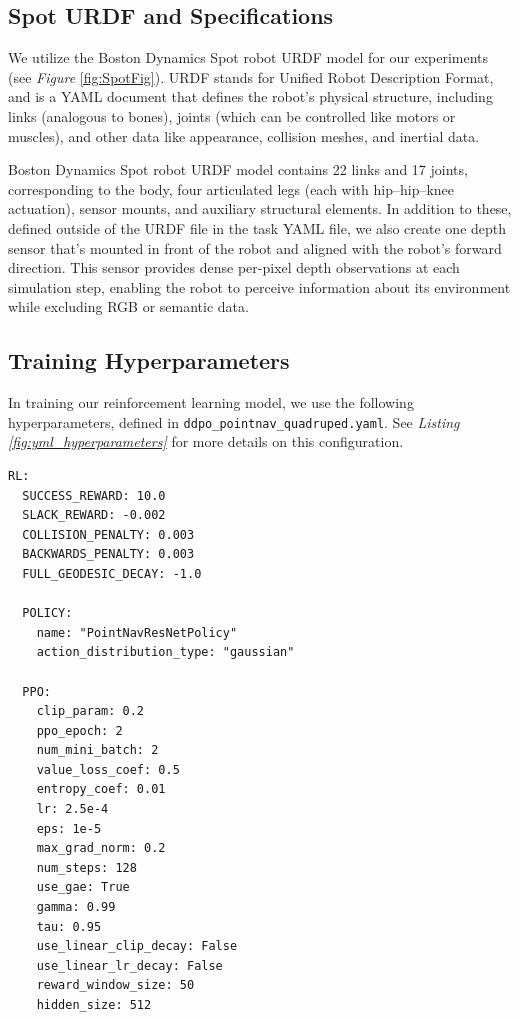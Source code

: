 \documentclass{article} %
\begin{document}
\subsection{Spot URDF and Specifications}
We utilize the Boston Dynamics Spot robot URDF model for our experiments (see \textit{Figure} \ref{fig:SpotFig}). URDF stands for Unified Robot Description Format, and is a YAML document that defines the robot's physical structure, including links (analogous to bones), joints (which can be controlled like motors or muscles), and other data like appearance, collision meshes, and inertial data.

Boston Dynamics Spot robot URDF model contains 22 links and 17 joints, corresponding to the body, four articulated legs (each with hip–hip–knee actuation), sensor mounts, and auxiliary structural elements. In addition to these, defined outside of the URDF file in the task YAML file, we also create one depth sensor that's mounted in front of the robot and aligned with the robot's forward direction. This sensor provides dense per-pixel depth observations at each simulation step, enabling the robot to perceive information about its environment while excluding RGB or semantic data.

\subsection{Training Hyperparameters}
In training our reinforcement learning model, we use the following hyperparameters, defined in \texttt{ddpo\_pointnav\_quadruped.yaml}. See \textit{Listing \ref{fig:yml_hyperparameters}} for more details on this configuration.
\begin{lstlisting}[style=yamlstyle, caption={This YAML configuration specifies the reward structure and PPO training parameters for our PointNav policy.}, label={fig:yml_hyperparameters}]
RL:
  SUCCESS_REWARD: 10.0
  SLACK_REWARD: -0.002
  COLLISION_PENALTY: 0.003
  BACKWARDS_PENALTY: 0.003
  FULL_GEODESIC_DECAY: -1.0

  POLICY:
    name: "PointNavResNetPolicy"
    action_distribution_type: "gaussian"

  PPO:
    clip_param: 0.2
    ppo_epoch: 2
    num_mini_batch: 2
    value_loss_coef: 0.5
    entropy_coef: 0.01
    lr: 2.5e-4
    eps: 1e-5
    max_grad_norm: 0.2
    num_steps: 128
    use_gae: True
    gamma: 0.99
    tau: 0.95
    use_linear_clip_decay: False
    use_linear_lr_decay: False
    reward_window_size: 50
    hidden_size: 512
\end{lstlisting}
\end{document}

